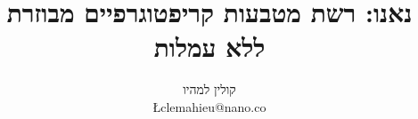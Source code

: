 \documentclass[journal]{IEEEtran}
\begin{document}
\title{נאנו: רשת מטבעות קריפטוגרפיים מבוזרת ללא עמלות}

\author{קולין למהיו\\ \L{clemahieu@nano.co} }%


% 
%


\maketitle


\end{document}
